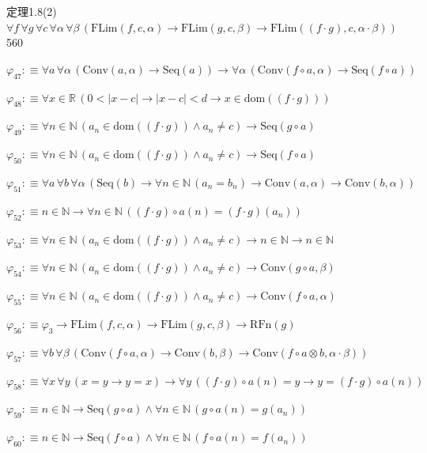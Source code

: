 \begin{fullproof}{定理1.8(2)}{$\forall f\,\forall g\,\forall c\,\forall \alpha\,\forall \beta\,(\mathrm{FLim}(f,c,\alpha) \to \mathrm{FLim}(g,c,\beta) \to \mathrm{FLim}((f \cdot g),c,\alpha \cdot \beta))$}{560}
\begin{abbrevlist}
\item $\varphi_{47} :\equiv \forall a\,\forall \alpha\,(\mathrm{Conv}(a,\alpha) \to \mathrm{Seq}(a)) \to \forall \alpha\,(\mathrm{Conv}(f \circ a,\alpha) \to \mathrm{Seq}(f \circ a))$
\item $\varphi_{48} :\equiv \forall x \in \mathbb{R}\,(0 < \lvert x - c \rvert \to \lvert x - c \rvert < d \to x \in \mathrm{dom}((f \cdot g)))$
\item $\varphi_{49} :\equiv \forall n \in \mathbb{N}\,(a_{n} \in \mathrm{dom}((f \cdot g)) \land a_{n} \neq c) \to \mathrm{Seq}(g \circ a)$
\item $\varphi_{50} :\equiv \forall n \in \mathbb{N}\,(a_{n} \in \mathrm{dom}((f \cdot g)) \land a_{n} \neq c) \to \mathrm{Seq}(f \circ a)$
\item $\varphi_{51} :\equiv \forall a\,\forall b\,\forall \alpha\,(\mathrm{Seq}(b) \to \forall n \in \mathbb{N}\,(a_{n} = b_{n}) \to \mathrm{Conv}(a,\alpha) \to \mathrm{Conv}(b,\alpha))$
\item $\varphi_{52} :\equiv n \in \mathbb{N} \to \forall n \in \mathbb{N}\,((f \cdot g) \circ a(n) = (f \cdot g)(a_{n}))$
\item $\varphi_{53} :\equiv \forall n \in \mathbb{N}\,(a_{n} \in \mathrm{dom}((f \cdot g)) \land a_{n} \neq c) \to n \in \mathbb{N} \to n \in \mathbb{N}$
\item $\varphi_{54} :\equiv \forall n \in \mathbb{N}\,(a_{n} \in \mathrm{dom}((f \cdot g)) \land a_{n} \neq c) \to \mathrm{Conv}(g \circ a,\beta)$
\item $\varphi_{55} :\equiv \forall n \in \mathbb{N}\,(a_{n} \in \mathrm{dom}((f \cdot g)) \land a_{n} \neq c) \to \mathrm{Conv}(f \circ a,\alpha)$
\item $\varphi_{56} :\equiv \varphi_{3} \to \mathrm{FLim}(f,c,\alpha) \to \mathrm{FLim}(g,c,\beta) \to \mathrm{RFn}(g)$
\item $\varphi_{57} :\equiv \forall b\,\forall \beta\,(\mathrm{Conv}(f \circ a,\alpha) \to \mathrm{Conv}(b,\beta) \to \mathrm{Conv}(f \circ a \otimes b,\alpha \cdot \beta))$
\item $\varphi_{58} :\equiv \forall x\,\forall y\,(x = y \to y = x) \to \forall y\,((f \cdot g) \circ a(n) = y \to y = (f \cdot g) \circ a(n))$
\item $\varphi_{59} :\equiv n \in \mathbb{N} \to \mathrm{Seq}(g \circ a) \land \forall n \in \mathbb{N}\,(g \circ a(n) = g(a_{n}))$
\item $\varphi_{60} :\equiv n \in \mathbb{N} \to \mathrm{Seq}(f \circ a) \land \forall n \in \mathbb{N}\,(f \circ a(n) = f(a_{n}))$

\end{abbrevlist}
\end{fullproof}
